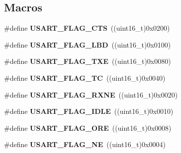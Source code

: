 \subsection*{Macros}
\begin{DoxyCompactItemize}
\item 
\mbox{\label{group___u_s_a_r_t___flags_ga94b7272319cca88a65075d5cb6048441}} 
\#define {\bfseries U\+S\+A\+R\+T\+\_\+\+F\+L\+A\+G\+\_\+\+C\+TS}~((uint16\+\_\+t)0x0200)
\item 
\mbox{\label{group___u_s_a_r_t___flags_ga27be6517de20ce14711f71dcd5a7b91f}} 
\#define {\bfseries U\+S\+A\+R\+T\+\_\+\+F\+L\+A\+G\+\_\+\+L\+BD}~((uint16\+\_\+t)0x0100)
\item 
\mbox{\label{group___u_s_a_r_t___flags_ga7129f13333f2a7218838cc32fe507bfa}} 
\#define {\bfseries U\+S\+A\+R\+T\+\_\+\+F\+L\+A\+G\+\_\+\+T\+XE}~((uint16\+\_\+t)0x0080)
\item 
\mbox{\label{group___u_s_a_r_t___flags_gae7b85c9e2cc86af5bbc8b8d8b854410f}} 
\#define {\bfseries U\+S\+A\+R\+T\+\_\+\+F\+L\+A\+G\+\_\+\+TC}~((uint16\+\_\+t)0x0040)
\item 
\mbox{\label{group___u_s_a_r_t___flags_ga11d6b70c8f00216b6d8a43790dfdcf2f}} 
\#define {\bfseries U\+S\+A\+R\+T\+\_\+\+F\+L\+A\+G\+\_\+\+R\+X\+NE}~((uint16\+\_\+t)0x0020)
\item 
\mbox{\label{group___u_s_a_r_t___flags_gac2f1ccc91a834f9cbec3f058872b972a}} 
\#define {\bfseries U\+S\+A\+R\+T\+\_\+\+F\+L\+A\+G\+\_\+\+I\+D\+LE}~((uint16\+\_\+t)0x0010)
\item 
\mbox{\label{group___u_s_a_r_t___flags_gabdb285b5c1876d93f9c802f9304538d5}} 
\#define {\bfseries U\+S\+A\+R\+T\+\_\+\+F\+L\+A\+G\+\_\+\+O\+RE}~((uint16\+\_\+t)0x0008)
\item 
\mbox{\label{group___u_s_a_r_t___flags_ga81781d27ffc8b85dfaf7b7b791229547}} 
\#define {\bfseries U\+S\+A\+R\+T\+\_\+\+F\+L\+A\+G\+\_\+\+NE}~((uint16\+\_\+t)0x0004)
\item 
\mbox{\label{group___u_s_a_r_t___flags_ga3551a32bac49a2ec040e5fdafcc9c4bd}} 

\end{DoxyCompactItemize}
